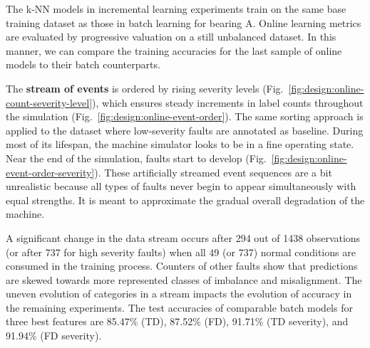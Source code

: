 The k-NN models in incremental learning experiments train on the same base training dataset as those in batch learning for bearing A. Online learning metrics are evaluated by progressive valuation on a still unbalanced dataset. In this manner, we can compare the training accuracies for the last sample of online models to their batch counterparts.

The \textbf{stream of events} is ordered by rising severity levels (Fig.~\ref{fig:design:online-count-severity-level}), which ensures steady increments in label counts throughout the simulation (Fig.~\ref{fig:design:online-event-order}). The same sorting approach is applied to the dataset where low-severity faults are annotated as baseline. During most of its lifespan, the machine simulator looks to be in a fine operating state. Near the end of the simulation, faults start to develop (Fig.~\ref{fig:design:online-event-order-severity}). These artificially streamed event sequences are a bit unrealistic because all types of faults never begin to appear simultaneously with equal strengths. It is meant to approximate the gradual overall degradation of the machine.

A significant change in the data stream occurs after 294 out of 1438 observations (or after 737 for high severity faults) when all 49 (or 737) normal conditions are consumed in the training process. Counters of other faults show that predictions are skewed towards more represented classes of imbalance and misalignment. The uneven evolution of categories in a stream impacts the evolution of accuracy in the remaining experiments. The test accuracies of comparable batch models for three best features are 85.47\% (TD), 87.52\% (FD), 91.71\% (TD severity), and 91.94\% (FD severity).

